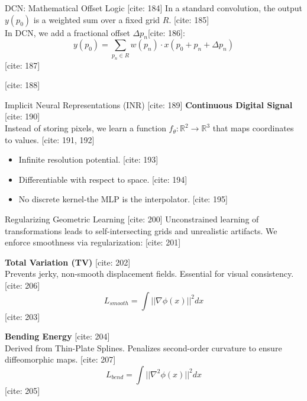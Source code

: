 \documentclass[aspectratio=169,10pt]{beamer}
\begin{document}
\begin{frame}{DCN: Mathematical Offset Logic [cite: 184]}
    In a standard convolution, the output $y(p_0)$ is a weighted sum over a fixed grid $R$. [cite: 185]\\
    In DCN, we add a fractional offset $\Delta p_n$[cite: 186]:
    $$y(p_{0})=\sum_{p_{n}\in R}w(p_{n})\cdot x(p_{0}+p_{n}+\Delta p_{n})$$ [cite: 187]
    \vspace{1em}

    \begin{table}[]
    \centering
    \end{table} [cite: 188]
\end{frame}

\begin{frame}{Implicit Neural Representations (INR) [cite: 189]}
    \textbf{Continuous Digital Signal} [cite: 190]\\
    Instead of storing pixels, we learn a function $f_{\theta}: \mathbb{R}^2 \rightarrow \mathbb{R}^3$ that maps coordinates to values. [cite: 191, 192]
    
    \vspace{0.5em}
    \begin{itemize}
        \item Infinite resolution potential. [cite: 193]
        \item Differentiable with respect to space. [cite: 194]
        \item No discrete kernel-the MLP is the interpolator. [cite: 195]
    \end{itemize}
\end{frame}

\begin{frame}{Regularizing Geometric Learning [cite: 200]}
    Unconstrained learning of transformations leads to self-intersecting grids and unrealistic artifacts. We enforce smoothness via regularization: [cite: 201]
    \vspace{1em}

    \textbf{Total Variation (TV)} [cite: 202]\\
    Prevents jerky, non-smooth displacement fields. Essential for visual consistency. [cite: 206]
    $$L_{smooth}=\int||\nabla\phi(x)||^{2}dx$$ [cite: 203]

    \textbf{Bending Energy} [cite: 204]\\
    Derived from Thin-Plate Splines. Penalizes second-order curvature to ensure diffeomorphic maps. [cite: 207]
    $$L_{bend}=\int||\nabla^{2}\phi(x)||^{2}dx$$ [cite: 205]
\end{frame}
\end{document}
